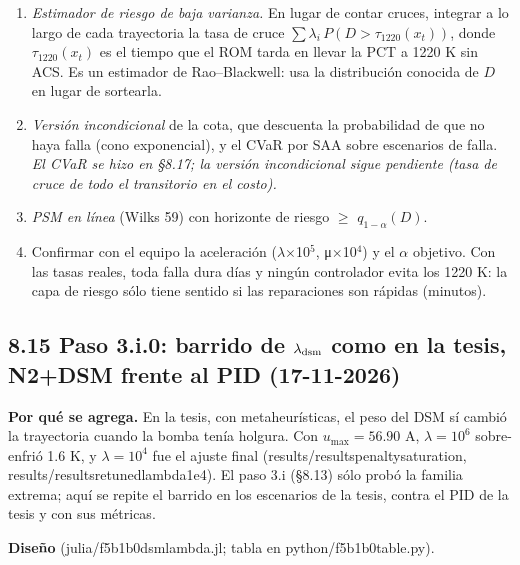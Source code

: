 \documentclass[11pt,a4paper]{article}
\newcommand{\codeus}{\textunderscore\allowbreak}
\newcommand{\code}[1]{{\small\ttfamily\let\_\codeus #1}}
\begin{document}
\begin{enumerate}
\item \emph{Estimador de riesgo de baja varianza.} En lugar de contar cruces, integrar a lo largo de cada trayectoria la tasa de cruce $\sum\lambda_i\,P(D>\tau_{1220}(x_t))$, donde $\tau_{1220}(x_t)$ es el tiempo que el ROM tarda en llevar la PCT a 1220 K sin ACS. Es un estimador de Rao–Blackwell: usa la distribución conocida de $D$ en lugar de sortearla.
\item \emph{Versión incondicional} de la cota, que descuenta la probabilidad de que no haya falla (cono exponencial), y el CVaR por SAA sobre escenarios de falla. \emph{El CVaR se hizo en \S{}8.17; la versión incondicional sigue pendiente (tasa de cruce de todo el transitorio en el costo).}
\item \emph{PSM en línea} (Wilks 59) con horizonte de riesgo $\ge$ $q_{1-\alpha}(D)$.
\item Confirmar con el equipo la aceleración ($\lambda$$\times$10$^{5}$, μ$\times$10$^{4}$) y el $\alpha$ objetivo. Con las tasas reales, toda falla dura días y ningún controlador evita los 1220 K: la capa de riesgo sólo tiene sentido si las reparaciones son rápidas (minutos).
\end{enumerate}

\subsection*{8.15 Paso 3.i.0: barrido de $\lambda_{\rm dsm}$ como en la tesis, N2+DSM frente al PID (17-11-2026)}
\textbf{Por qué se agrega.} En la tesis, con metaheurísticas, el peso del DSM sí cambió la trayectoria cuando la bomba tenía holgura. Con $u_{\max}=56.90$ A, $\lambda=10^6$ sobre-enfrió 1.6 K, y $\lambda=10^4$ fue el ajuste final (\code{results/results\_penalty\_saturation}, \code{results/results\_retuned\_lambda1e4}). El paso 3.i (\S{}8.13) sólo probó la familia extrema; aquí se repite el barrido en los escenarios de la tesis, contra el PID de la tesis y con sus métricas.

\textbf{Diseño} (\code{julia/f5b1b0\_dsm\_lambda.jl}; tabla en \code{python/f5b1b0\_table.py}).
\end{document}
